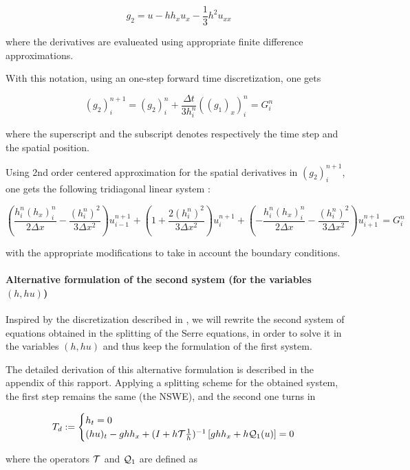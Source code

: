 $$g_2 = u - h h_x u_x - \frac{1}{3}h^2 u_{xx}$$

\noindent where the derivatives are evalueated using appropriate finite difference approximations.

\indent With this notation, using an one-step forward time discretization, one gets

$$(g_2)_i^{n+1} = (g_2)_i^n + \frac{\Delta t}{3h_i^n} \left(\left( g_1 \right)_x\right)_i^n = G_i^n$$

\noindent where the superscript and the subscript denotes respectively the time step and the spatial position.

\indent Using 2nd order centered approximation for the spatial derivatives in $(g_2)_i^{n+1}$, one gets the following tridiagonal linear system :

$$\left( \frac{h_i^n(h_x)_i^n}{2\Delta x} - \frac{(h_i^n)^2}{3\Delta x^2} \right)u_{i-1}^{n+1} + 
 \left( 1 + \frac{2(h_i^n)^2}{3\Delta x^2} \right)u_{i}^{n+1} + 
 \left( -\frac{h_i^n(h_x)_i^n}{2\Delta x} - \frac{(h_i^n)^2}{3\Delta x^2} \right)u_{i+1}^{n+1} = G_i^n $$
 
\noindent with the appropriate modifications to take in account the boundary conditions.
 
 
\paragraph{Alternative formulation of the second system (for the variables $(h,hu)$)}
 
\indent Inspired by the discretization described in \cite{Bonneton2011}, we will rewrite the second system of equations obtained in the splitting of the Serre equations, in order to solve it in the variables $(h,hu)$ and thus keep the formulation of the first system.
 
\indent The detailed derivation of this alternative formulation is described in the appendix of this rapport. Applying a splitting scheme for the obtained system, the first step remains the same (the NSWE), and the second one turns in
 
\begin{equation}
	T_d := \begin{cases}
		h_t = 0 \\
		(hu)_t  -ghh_x + (I + h\mathcal{T}\frac{1}{h})^{-1}\left[ ghh_x + h\mathcal{Q}_1(u) \right] = 0
	\end{cases}	
\end{equation}

\indent where the operators $\mathcal{T}$ and $\mathcal{Q}_1$ are defined as

